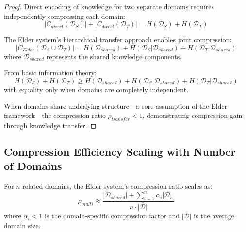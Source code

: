 \begin{proof}
Direct encoding of knowledge for two separate domains requires independently compressing each domain:
\begin{equation}
|C_{direct}(\mathcal{D}_S)| + |C_{direct}(\mathcal{D}_T)| = H(\mathcal{D}_S) + H(\mathcal{D}_T)
\end{equation}

The Elder system's hierarchical transfer approach enables joint compression:
\begin{equation}
|C_{Elder}(\mathcal{D}_S \cup \mathcal{D}_T)| = H(\mathcal{D}_{shared}) + H(\mathcal{D}_S | \mathcal{D}_{shared}) + H(\mathcal{D}_T | \mathcal{D}_{shared})
\end{equation}
where $\mathcal{D}_{shared}$ represents the shared knowledge components.

From basic information theory:
\begin{equation}
H(\mathcal{D}_S) + H(\mathcal{D}_T) \geq H(\mathcal{D}_{shared}) + H(\mathcal{D}_S | \mathcal{D}_{shared}) + H(\mathcal{D}_T | \mathcal{D}_{shared})
\end{equation}
with equality only when domains are completely independent.

When domains share underlying structure—a core assumption of the Elder framework—the compression ratio $\rho_{transfer} < 1$, demonstrating compression gain through knowledge transfer.
\end{proof}

\subsection{Compression Efficiency Scaling with Number of Domains}

\begin{theorem}
For $n$ related domains, the Elder system's compression ratio scales as:
\begin{equation}
\rho_{multi} \approx \frac{|\mathcal{D}_{shared}| + \sum_{i=1}^n \alpha_i |\mathcal{D}_i|}{n \cdot \overline{|\mathcal{D}|}}
\end{equation}
where $\alpha_i < 1$ is the domain-specific compression factor and $\overline{|\mathcal{D}|}$ is the average domain size.
\end{theorem}


